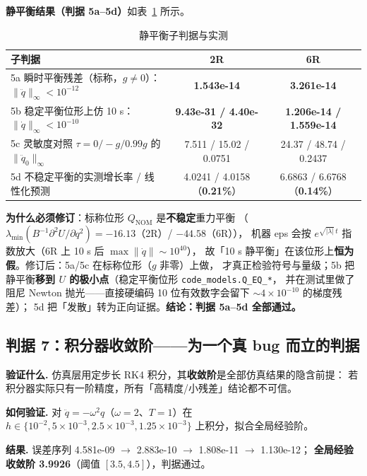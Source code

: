 \documentclass[11pt,a4paper]{ctexart}
\begin{document}
\textbf{静平衡结果（判据 5a--5d）}如表~\ref{tab:static} 所示。

\begin{table}[H]
\centering
\small
\caption{静平衡子判据与实测}\label{tab:static}
\setlength{\tabcolsep}{4pt}
\begin{tabular}{@{}l c c@{}}
\toprule
子判据 & 2R & 6R \\
\midrule
5a 瞬时平衡残差（标称，$g\ne0$）：$\|\ddot q\|_\infty<10^{-12}$ & \textbf{1.543e-14} & \textbf{3.261e-14} \\
5b 稳定平衡位形上仿 10 s：$\|\dot q\|_\infty<10^{-10}$ & \textbf{9.43e-31 / 4.40e-32} & \textbf{1.206e-14 / 1.559e-14} \\
5c 灵敏度对照 $\tau=0/-g/0.99g$ 的 $\|\ddot q_0\|_\infty$ & 7.511 / 15.02 / 0.0751 & 24.37 / 48.74 / 0.2437 \\
5d 不稳定平衡的实测增长率 / 线性化预测 & 4.0241 / 4.0158（\textbf{0.21\%}） & 6.6863 / 6.6768（\textbf{0.14\%}） \\
\bottomrule
\end{tabular}
\end{table}

\textbf{为什么必须修订}：标称位形 $Q_{\mathrm{NOM}}$ 是\textbf{不稳定}重力平衡
（$\lambda_{\min}(B^{-1}\partial^2U/\partial q^2)=-16.13$（2R）/ $-44.58$（6R）），
机器 eps 会按 $e^{\sqrt{|\lambda|}\,t}$ 指数放大（6R 上 10 s 后 $\max\|\dot q\|\sim10^{40}$），
故「10 s 静平衡」在该位形上\textbf{恒为假}。修订后：5a/5c 在标称位形（$g$ 非零）上做，
才真正检验符号与量级；5b 把静平衡\textbf{移到 $U$ 的极小点}（稳定平衡位形 \texttt{code\_models.Q\_EQ\_*}，
并在测试里做了阻尼 Newton 抛光——直接硬编码 10 位有效数字会留下 $\sim4\times10^{-10}$ 的梯度残差）；
5d 把「发散」转为正向证据。\textbf{结论：判据 5a--5d 全部通过。}

\subsection{判据 7：积分器收敛阶——为一个真 bug 而立的判据}\label{sec:integrator}

\textbf{验证什么.} 仿真层用定步长 RK4 积分，其\textbf{收敛阶}是全部仿真结果的隐含前提：
若积分器实际只有一阶精度，所有「高精度/小残差」结论都不可信。

\textbf{如何验证.} 对 $\ddot q=-\omega^2q$（$\omega=2$、$T=1$）在
$h\in\{10^{-2},5\times10^{-3},2.5\times10^{-3},1.25\times10^{-3}\}$ 上积分，拟合全局经验阶。

\textbf{结果.} 误差序列 4.581e-09 $\to$ 2.883e-10 $\to$ 1.808e-11 $\to$ 1.130e-12；
\textbf{全局经验收敛阶 3.9926}（阈值 $[3.5,4.5]$），判据通过。
\end{document}
